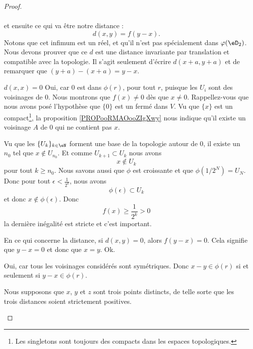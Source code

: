 \begin{proof}
\begin{subproof}
\begin{equation}
\begin{aligned}
			\end{aligned}
		\end{equation}
		et ensuite ce qui va être notre distance :
		\begin{equation}\label{EqDefDistanceCompatible}
			d(x,y) = f(y-x).
		\end{equation}
		Notons que cet infimum est un réel, et qu'il n'est pas spécialement dans \( \varphi(\eD_2)\). Nous devons prouver que ce \( d\) est une distance invariante par translation et compatible avec la topologie.
		Il s'agit seulement d'écrire \( d(x+a,y+a)\) et de remarquer que \( (y+a)-(x+a)=y-x\).
		\item [\( d(x,x) = 0\)] Oui, car \(0\) est dans \(\phi(r)\), pour tout \(r \), puisque les \( U_i \) sont des voisinages de \(0\).
		\spitem[\( d(x,y)=0\) implique \( x=y\)]
		Nous montrons que \( f(x)\neq 0\) dès que \( x\neq 0\). Rappellez-vous que nous avons posé l'hypothèse que \( \{ 0 \}\) est un fermé dans \( V\). Vu que \( \{ x \}\) est un compact\footnote{Les singletons sont toujours des compacts dans les espaces topologiques.}, la proposition \ref{PROPooRMAOooZIgXwy} nous indique qu'il existe un voisinage \( A\) de \( 0\) qui ne contient pas \( x\).

		Vu que les \( \{ U_k \}_{k\in \eN}\) forment une base de la topologie autour de \( 0\), il existe un \( n_0\) tel que \( x\notin U_{n_0}\). Et comme \( U_{k+1}\subset U_k\) nous avons
		\begin{equation}
			x\notin U_k
		\end{equation}
		pour tout \( k\geq n_0\). Nous savons aussi que \( \phi\) est croissante et que \( \phi(1/2^N)=U_N\). Donc pour tout \( \epsilon<\frac{1}{ 2^k }\), nous avons
		\begin{equation}
			\phi(\epsilon)\subset U_k
		\end{equation}
		et donc \( x\notin \phi(\epsilon)\). Donc
		\begin{equation}
			f(x)\geq \frac{1}{ 2^k }>0
		\end{equation}
		la dernière inégalité est stricte et c'est important.

		En ce qui concerne la distance, si \( d(x,y)=0\), alors \( f(y-x)=0\). Cela signifie que \( y-x=0\) et donc que \( x=y\). Ok.

		\spitem[\( d(x,y) = d(y,x)\)] Oui, car tous les voisinages considérés sont symétriques. Donc \( x-y\in \phi(r)\) si et seulement si \( y-x\in \phi(r)\).

		\spitem[\( d(x,z) \leq d(x,y) + d(y,z)\)] Nous supposons que \( x\), \( y\) et \( z\) sont trois points distincts, de telle sorte que les trois distances soient strictement positives.


\end{subproof}
\end{proof}
